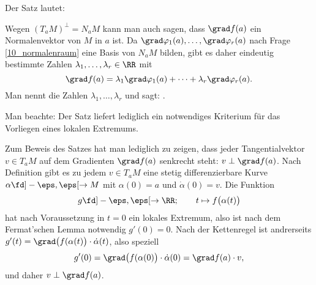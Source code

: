 \begin{antwort}
  Der Satz lautet: 

  \medskip\noindent

  \medskip\noindent
  Wegen $(T_aM)^\perp = N_a M$ kann man auch sagen, dass 
  $\grad f(a)$ ein Normalenvektor von $M$ in $a$ ist. Da 
  $\grad \varphi_1( a),\ldots,\grad \varphi_r (a)$ nach Frage 
  \ref{10_normalenraum} eine Basis 
  von $N_aM$ bilden, gibt es daher eindeutig bestimmte Zahlen 
  $\lambda_1, \ldots, \lambda_r \in \RR$ mit 
  \[
  \grad f(a) = \lambda_1 \grad \varphi_1 (a)+ \cdots + 
  \lambda_r \grad  \varphi_r (a).
  \]
  Man nennt die Zahlen $\lambda_1, \ldots, \lambda_r$ 
   und sagt: 
  . 

  Man beachte: Der Satz liefert lediglich ein notwendiges Kriterium 
  für das Vorliegen eines lokalen Extremums. 
  
  \medskip
  Zum Beweis des Satzes hat man lediglich zu zeigen, dass jeder 
  Tangentialvektor $v\in T_aM$ auf dem Gradienten $\grad f(a)$ senkrecht 
  steht: $v \perp \grad f(a)$. Nach Definition gibt es zu jedem 
  $v\in T_aM$ eine stetig differenzierbare Kurve 
  $\alpha \fd ] -\eps, \eps [ \to M$ mit $\alpha(0)=a$ und 
  $\dot{\alpha}(0)=v$. Die Funktion 
  \[
  g\fd ]-\eps, \eps[ \to \RR; \qquad t\mapsto f \big( \alpha(t) \big)
  \]
  hat nach Voraussetzung in $t=0$ ein lokales Extremum, also ist nach dem 
  Fermat'schen Lemma notwendig $g'(0)=0$. Nach der Kettenregel ist andrerseits
  $g'(t)=\grad\big( f(\alpha(t) \big) \cdot \dot{\alpha}(t)$, also 
  speziell 
  \[
  g'(0)=\grad\big( f(\alpha(0) \big) \cdot \dot{\alpha}(0)=
  \grad f(a) \cdot v,
  \]
  und daher $v \perp \grad f(a)$. \AntEnd
\end{antwort}

